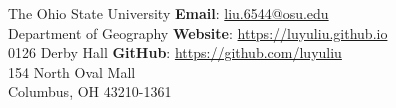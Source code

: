 \documentclass[letterpaper, 11pt]{article}
\begin{document}
\hfill{  The Ohio State University} \hfill{\large \textbf{Email}: \href{liu.6544@osu.edu}{liu.6544@osu.edu}} \\
\hfill{Department of Geography} \hfill{\large \textbf{Website}: \href{https://luyuliu.github.io}{https://luyuliu.github.io}} \\
\hfill{0126 Derby Hall} \hfill{\large \textbf{GitHub}: \href{https://github.com/luyuliu}{https://github.com/luyuliu}} \\
{154 North Oval Mall} \\
{Columbus, OH 43210-1361} \\


\setlength{\tabcolsep}{0pt}
\end{document}
